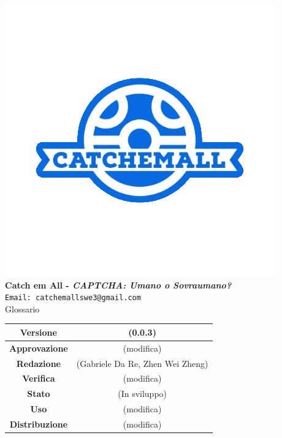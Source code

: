 \begin{titlepage}
\begin{center}
		\includegraphics[scale = 1.5]{img/logo.png}\\
		\bigskip
		\large \textbf{Catch em All - \textit{CAPTCHA: Umano o Sovraumano?}}\\
		\texttt{Email: catchemallswe3@gmail.com}\\
		\vfill
		{\fontsize{1.5cm}{0}\selectfont Glossario}\\
		\vfill
		\renewcommand\tabularxcolumn[1]{>{\Centering}m{#1}}
		\begin{tabularx}{\textwidth}{|c|c|}
			\hline
			\textbf{Versione}      & (0.0.3)                                          \\
			\hline
			\textbf{Approvazione}  & (modifica)                                       \\
			\hline
			\textbf{Redazione}     & (Gabriele Da Re, Zhen Wei Zheng) \\
			\hline
			\textbf{Verifica}      & (modifica)                                       \\
			\hline
			\textbf{Stato}         & (In sviluppo)                                    \\
			\hline
			\textbf{Uso}           & (modifica)                                       \\
			\hline
			\textbf{Distribuzione} & (modifica)                                       \\
			\hline
		\end{tabularx}
	\end{center}
\end{titlepage} 